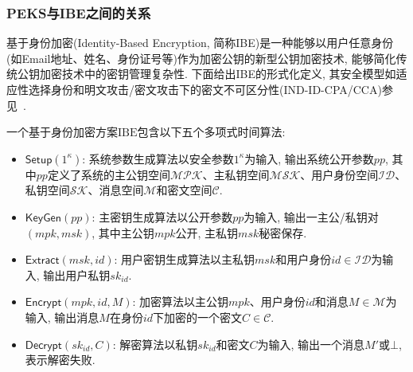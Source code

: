 \subsubsection{PEKS与IBE之间的关系}
基于身份加密(Identity-Based Encryption, 简称IBE)是一种能够以用户任意身份(如Email地址、姓名、身份证号等)作为加密公钥的新型公钥加密技术, 能够简化传统公钥加密技术中的密钥管理复杂性. 下面给出IBE的形式化定义, 其安全模型如适应性选择身份和明文攻击/密文攻击下的密文不可区分性(IND-ID-CPA/CCA)参见~\cite{BF-SIAM-2003}.
\begin{definition}[基于身份加密]
一个基于身份加密方案$\text{IBE}$包含以下五个多项式时间算法:
\begin{itemize}
\item $\mathsf{Setup}(1^\kappa)$: 系统参数生成算法以安全参数$1^\kappa$为输入, 输出系统公开参数$pp$, 其中$pp$定义了系统的主公钥空间$\mathcal{MPK}$、主私钥空间$\mathcal{MSK}$、用户身份空间$\mathcal{ID}$、私钥空间$\mathcal{SK}$、消息空间$\mathcal{M}$和密文空间$\mathcal{C}$.

\item $\mathsf{KeyGen}(pp)$: 主密钥生成算法以公开参数$pp$为输入, 输出一主公/私钥对$(mpk, msk)$, 其中主公钥$mpk$公开, 主私钥$msk$秘密保存.

\item $\mathsf{Extract}(msk, id)$: 用户密钥生成算法以主私钥$msk$和用户身份$id \in \mathcal{ID}$为输入, 输出用户私钥$sk_{id}$.

\item $\mathsf{Encrypt}(mpk, id, M)$: 加密算法以主公钥$mpk$、用户身份$id$和消息$M \in \mathcal{M}$为输入, 输出消息$M$在身份$id$下加密的一个密文$C \in \mathcal{C}$.

\item $\mathsf{Decrypt}(sk_{id}, C)$: 解密算法以私钥$sk_{id}$和密文$C$为输入, 输出一个消息$M'$或$\bot$, 表示解密失败.
\end{itemize}
\end{definition}

